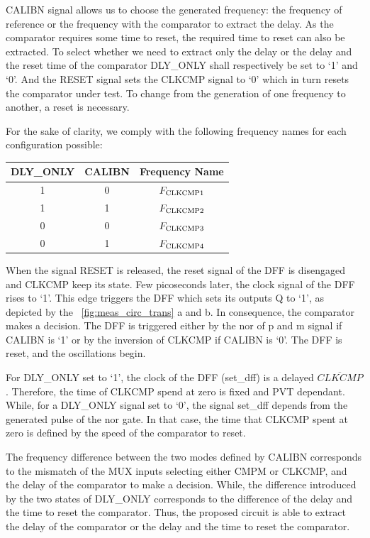 CALIBN signal allows us to choose the generated frequency: the frequency of reference or the frequency with the comparator to extract the delay. As the comparator requires some time to reset, the required time to reset can also be extracted. To select whether we need to extract only the delay or the delay and the reset time of the comparator DLY\_ONLY shall respectively be set to `1' and `0'. And the RESET signal sets the CLKCMP signal to `0' which in turn resets the comparator under test. To change from the generation of one frequency to another, a reset is necessary.

For the sake of clarity, we comply with the following frequency names for each configuration possible:
\begin{table}[htp]
    \centering
    \begin{tabular}{@{}ccc@{}}
    \toprule
    DLY\_ONLY & CALIBN & Frequency Name \\ \midrule
    1 & 0 & $F_{\rm CLKCMP1}$ \\
    1 & 1 & $F_{\rm CLKCMP2}$ \\
    0 & 0 & $F_{\rm CLKCMP3}$ \\
    0 & 1 & $F_{\rm CLKCMP4}$ \\ \bottomrule
    \end{tabular}
\end{table}

When the signal RESET is released, the reset signal of the DFF is disengaged and CLKCMP keep its state. Few picoseconds later, the clock signal of the DFF rises to `1'. This edge triggers the DFF which sets its outputs Q to `1', as depicted by the \figurename~\ref{fig:meas_circ_trans} a and b. In consequence, the comparator makes a decision. The DFF is triggered either by the nor of p and m signal if CALIBN is `1' or by the inversion of CLKCMP if CALIBN is `0'. The DFF is reset, and the oscillations begin.

For DLY\_ONLY set to `1', the clock of the DFF (set\_dff) is a delayed \(\overline{CLKCMP}\). Therefore, the time of CLKCMP spend at zero is fixed and PVT dependant. While, for a DLY\_ONLY signal set to `0', the signal set\_dff depends from the generated pulse of the nor gate. In that case, the time that CLKCMP spent at zero is defined by the speed of the comparator to reset.

The frequency difference between the two modes defined by CALIBN corresponds to the mismatch of the MUX inputs selecting either CMPM or CLKCMP, and the delay of the comparator to make a decision. While, the difference introduced by the two states of DLY\_ONLY corresponds to the difference of the delay and the time to reset the comparator. Thus, the proposed circuit is able to extract the delay of the comparator or the delay and the time to reset the comparator.


